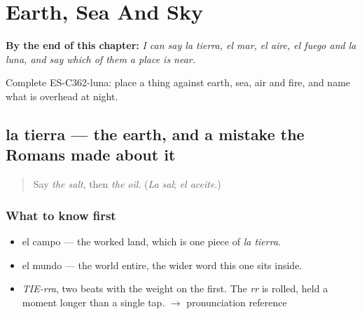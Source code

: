 
\chapter{Earth, Sea And Sky}
\label{ch:la-tierra-y-el-mar}

\begin{chapteropening}
\textbf{By the end of this chapter:} \emph{I can say la tierra, el mar, el aire, el fuego and la luna, and say which of them a place is near.}

Complete ES-C362-luna: place a thing against earth, sea, air and fire, and name what is overhead at night.
\end{chapteropening}

\section[la tierra]{la tierra — the earth, and a mistake the Romans made about it}

\label{lesson:ES-C362-tierra}



\begin{quote}
Say \emph{the salt}, then \emph{the oil}. (\emph{La sal}; \emph{el aceite}.)
\end{quote}

\subsection*{What to know first}
\begin{itemize}
\raggedright
  \item el campo — the worked land, which is one piece of \emph{la tierra}.
  \item el mundo — the world entire, the wider word this one sits inside.
\end{itemize}

\begin{sounds}
\begin{itemize}
\raggedright
  \item \emph{TIE-rra}, two beats with the weight on the first. The \emph{rr} is rolled, held a moment longer than a single tap. $\to$ pronunciation reference
\end{itemize}
\end{sounds}

